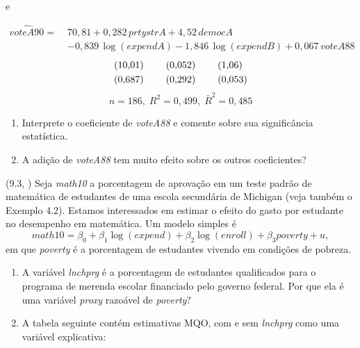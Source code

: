 \documentclass[12pt,letterpaper, onecolumn]{exam}
\begin{document}
\begin{questions}
e

\[
\begin{aligned}
\widehat{voteA90}=\;& 70{,}81+0{,}282\,prtystrA+4{,}52\,democA \\
& -0{,}839\,\log(expendA)-1{,}846\,\log(expendB)+0{,}067\,voteA88
\end{aligned}
\]
\[
\begin{aligned}
& (10{,}01)\hspace{0.8cm}(0{,}052)\hspace{0.8cm}(1{,}06) \\
& (0{,}687)\hspace{0.8cm}(0{,}292)\hspace{0.8cm}(0{,}053)
\end{aligned}
\]
\[
n=186,\; R^2=0{,}499,\; \bar{R}^2=0{,}485
\]

\begin{enumerate}[label=(\roman*)]
    \item Interprete o coeficiente de \textit{voteA88} e comente sobre sua significância estatística.
    \item A adição de \textit{voteA88} tem muito efeito sobre os outros coeficientes?
\end{enumerate}

\vspace{0.7cm}

\question\qstar (9.3, \citep{wooldridge2016}) Seja \textit{math10} a porcentagem de aprovação em um teste padrão de matemática de estudantes de uma escola secundária de Michigan (veja também o Exemplo 4.2). Estamos interessados em estimar o efeito do gasto por estudante no desempenho em matemática. Um modelo simples é
\[
math10=\beta_0+\beta_1\log(expend)+\beta_2\log(enroll)+\beta_3 poverty+u,
\]
em que \textit{poverty} é a porcentagem de estudantes vivendo em condições de pobreza.
\begin{enumerate}[label=(\roman*)]
    \item A variável \textit{lnchprg} é a porcentagem de estudantes qualificados para o programa de merenda escolar financiado pelo governo federal. Por que ela é uma variável \textit{proxy} razoável de \textit{poverty}?
    \item A tabela seguinte contém estimativas MQO, com e sem \textit{lnchprg} como uma variável explicativa:
\end{enumerate}


\end{questions}
\end{document}
